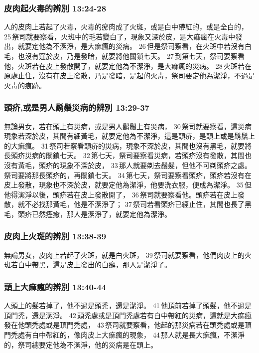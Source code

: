 \subsubsection{皮肉起火毒的辨別 13:24-28}
人的皮肉上若起了火毒，火毒的瘀肉成了火斑，或是白中帶紅的，或是全白的， 25 祭司就要察看，火斑中的毛若變白了，現象又深於皮，是大痲瘋在火毒中發出，就要定他為不潔淨，是大痲瘋的災病。 26 但是祭司察看，在火斑中若沒有白毛，也沒有窪於皮，乃是發暗，就要將他關鎖七天。 27 到第七天，祭司要察看他，火斑若在皮上發散開了，就要定他為不潔淨，是大痲瘋的災病。 28 火斑若在原處止住，沒有在皮上發散，乃是發暗，是起的火毒，祭司要定他為潔淨，不過是火毒的痕跡。

\subsubsection{頭疥,或是男人鬍鬚災病的辨別 13:29-37}
無論男女，若在頭上有災病，或是男人鬍鬚上有災病， 30 祭司就要察看，這災病現象若深於皮，其間有細黃毛，就要定他為不潔淨，這是頭疥，是頭上或是鬍鬚上的大痲瘋。 31 祭司若察看頭疥的災病，現象不深於皮，其間也沒有黑毛，就要將長頭疥災病的關鎖七天。 32 第七天，祭司要察看災病，若頭疥沒有發散，其間也沒有黃毛，頭疥的現象不深於皮， 33 那人就要剃去鬚髮，但他不可剃頭疥之處。祭司要將那長頭疥的，再關鎖七天。 34 第七天，祭司要察看頭疥，頭疥若沒有在皮上發散，現象也不深於皮，就要定他為潔淨，他要洗衣服，便成為潔淨。 35 但他得潔淨以後，頭疥若在皮上發散開了， 36 祭司就要察看他。頭疥若在皮上發散，就不必找那黃毛，他是不潔淨了； 37 祭司若看頭疥已經止住，其間也長了黑毛，頭疥已然痊癒，那人是潔淨了，就要定他為潔淨。

\subsubsection{皮肉上火斑的辨別 13:38-39}
無論男女，皮肉上若起了火斑，就是白火斑， 39 祭司就要察看，他們肉皮上的火斑若白中帶黑，這是皮上發出的白癬，那人是潔淨了。

\subsubsection{頭上大痲瘋的辨別 13:40-44}
人頭上的髮若掉了，他不過是頭禿，還是潔淨。 41 他頂前若掉了頭髮，他不過是頂門禿，還是潔淨。 42 頭禿處或是頂門禿處若有白中帶紅的災病，這就是大痲瘋發在他頭禿處或是頂門禿處， 43 祭司就要察看，他起的那災病若在頭禿處或是頂門禿處有白中帶紅的，像肉皮上大痲瘋的現象， 44 那人就是長大痲瘋，不潔淨的，祭司總要定他為不潔淨，他的災病是在頭上。


